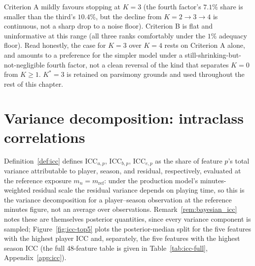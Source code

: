 \begin{table}[tbp]
\centering
\caption{Criteria A and B across candidate ranks (\S\ref{sec:rank_qualitative}). Criterion A: last canonical
factor's share of $\bar{\boldsymbol\Lambda}_a\bar{\boldsymbol\Lambda}_a^\top$'s total variance. Criterion B:
mean fraction of standardised residual cells exceeding $\tau_{99}$, the $99$th percentile of each fit's own
$t(\hat\nu)$ (each fit's estimated degrees of freedom $\hat\nu$ therefore differs, but is not shown as a
separate column here). $K=4$'s row is from the constant-residual-scale family (see text); $K=2$ and $K=3$ are
from the production, minutes-scaled family.}
\label{tab:rank-criteria}

\end{table}

Criterion A mildly favours stopping at $K=3$ (the fourth factor's $7.1\%$ share is smaller than the third's
$10.4\%$, but the decline from $K{=}2\to3\to4$ is continuous, not a sharp drop to a noise floor). Criterion B
is flat and uninformative at this range (all three ranks comfortably under the $1\%$ adequacy floor). Read
honestly, the case for $K=3$ over $K=4$ rests on Criterion A alone, and amounts to a preference for the simpler
model under a still-shrinking-but-not-negligible fourth factor, not a clean reversal of the kind that separates
$K=0$ from $K\geq1$. $K^*=3$ is retained on parsimony grounds and used throughout the rest of this chapter.

\FloatBarrier

\section{Variance decomposition: intraclass correlations}
\label{sec:results-icc}

Definition~\ref{def:icc} defines $\mathrm{ICC}_{a,p}$, $\mathrm{ICC}_{b,p}$, $\mathrm{ICC}_{e,p}$ as the share
of feature $p$'s total variance attributable to player, season, and residual, respectively, evaluated at the
reference exposure $m_n=m_{\mathrm{ref}}$: under the production model's minutes-weighted residual scale the
residual variance depends on playing time, so this is the variance decomposition for a player--season
observation at the reference minutes figure, not an average over observations.
Remark~\ref{rem:bayesian_icc} notes these are themselves posterior quantities, since every variance component
is sampled; Figure~\ref{fig:icc-top5} plots the posterior-median split for the five features with the highest
player ICC and, separately, the five features with the highest season ICC (the full 48-feature table is given
in Table~\ref{tab:icc-full}, Appendix~\ref{app:icc}).

